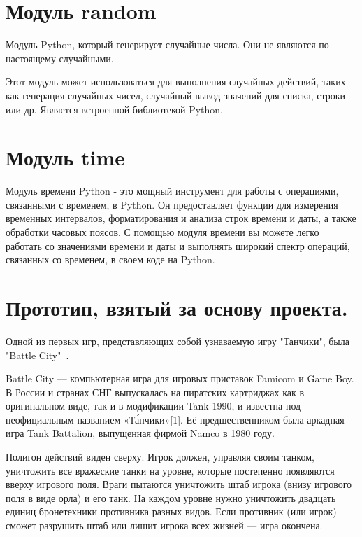 \section{\label{sec:ch01/sec02}Модуль random}
Модуль Python, который генерирует случайные числа. Они не являются по-настоящему случайными.

Этот модуль может использоваться для выполнения случайных действий, таких как генерация случайных чисел, случайный вывод значений для списка, строки или др. Является встроенной библиотекой Python.

\section{\label{sec:ch01/sec02}Модуль time}
Модуль времени Python - это мощный инструмент для работы с операциями, связанными с временем, в Python. Он предоставляет функции для измерения временных интервалов, форматирования и анализа строк времени и даты, а также обработки часовых поясов. С помощью модуля времени вы можете легко работать со значениями времени и даты и выполнять широкий спектр операций, связанных со временем, в своем коде на Python.

\section{\label{sec:ch01/sec02}Прототип, взятый за основу проекта.}
Одной из первых игр, представляющих собой узнаваемую игру "Танчики", была "Battle City"~\cite{battle-city}.

Battle City — компьютерная игра для игровых приставок Famicom и Game Boy. В России и странах СНГ выпускалась на пиратских картриджах как в оригинальном виде, так и в модификации Tank 1990, и известна под неофициальным названием «Та́нчики»[1]. Её предшественником была аркадная игра Tank Battalion, выпущенная фирмой Namco в 1980 году.

Полигон действий виден сверху. Игрок должен, управляя своим танком, уничтожить все вражеские танки на уровне, которые постепенно появляются вверху игрового поля. Враги пытаются уничтожить штаб игрока (внизу игрового поля в виде орла) и его танк. На каждом уровне нужно уничтожить двадцать единиц бронетехники противника разных видов. Если противник (или игрок) сможет разрушить штаб или лишит игрока всех жизней — игра окончена.
